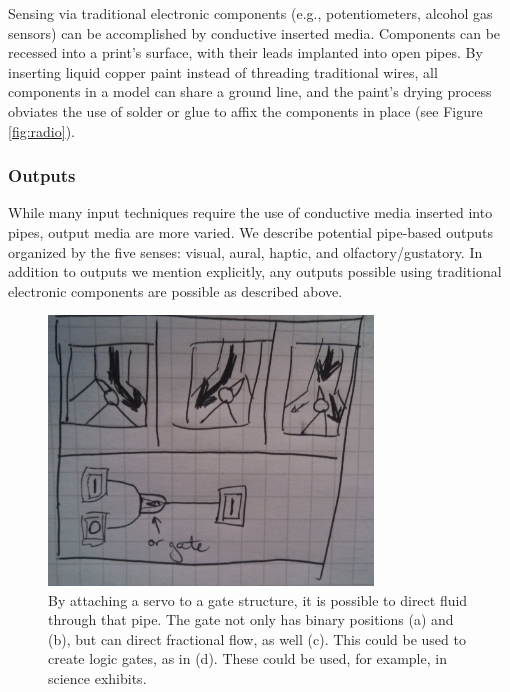 Sensing via traditional electronic components (e.g., potentiometers, alcohol gas sensors) can be accomplished by conductive inserted media.  Components can be recessed into a print's surface, with their leads implanted into open pipes.  By inserting liquid copper paint instead of threading traditional wires, all components in a model can share a ground line, and the paint's drying process obviates the use of solder or glue to affix the components in place (see Figure \ref{fig:radio}).

\subsubsection{Outputs}

While many input techniques require the use of conductive media inserted into pipes, output media are more varied.  We describe potential pipe-based outputs organized by the five senses: visual, aural, haptic, and olfactory/gustatory.  In addition to outputs we mention explicitly, any outputs possible using traditional electronic components are possible as described above.

\begin{figure}[h]
\centering
    \includegraphics[width=3.4in]{figures/placeholder/direct.jpg}
\caption{By attaching a servo to a gate structure, it is possible to direct fluid through that pipe.  The gate not only has binary positions (a) and (b), but can direct fractional flow, as well (c).  This could be used to create logic gates, as in (d).  These could be used, for example, in science exhibits.}
\label{fig:direct}
\end{figure}

